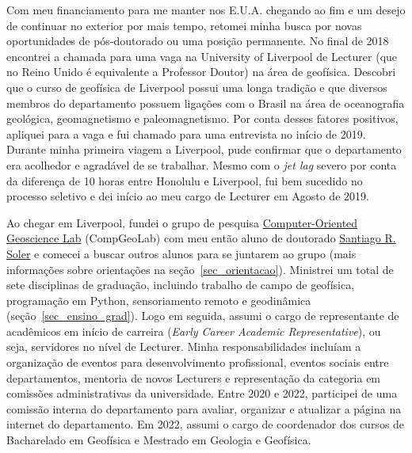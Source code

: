 \documentclass[12pt,a4paper,oneside]{book}
\newcommand{\UoL}{University of Liverpool}
\newcommand{\SantiagoLink}{\href{https://www.santisoler.com/}{Santiago R. Soler}}
\begin{document}
Com meu financiamento para me manter nos E.U.A. chegando ao fim e um desejo de
continuar no exterior por mais tempo, retomei minha busca por novas
oportunidades de pós-doutorado ou uma posição permanente.
No final de 2018 encontrei a chamada para uma vaga na \UoL{}
de Lecturer (que no Reino Unido é equivalente a Professor Doutor) na área de
geofísica.
Descobri que o curso de geofísica de Liverpool possui uma longa tradição e
que diversos membros do departamento possuem ligações com o Brasil na área de
oceanografia geológica, geomagnetismo e paleomagnetismo.
Por conta desses fatores positivos, apliquei para a vaga e fui chamado para
uma entrevista no início de 2019.
Durante minha primeira viagem a Liverpool, pude confirmar que o departamento
era acolhedor e agradável de se trabalhar.
Mesmo com o \textit{jet lag} severo por conta da diferença de 10 horas entre
Honolulu e Liverpool, fui bem sucedido no processo seletivo e dei início ao meu
cargo de Lecturer em Agosto de 2019.

Ao chegar em Liverpool, fundei o grupo de pesquisa
\href{https://www.compgeolab.org/}{Computer-Oriented Geoscience Lab} (CompGeoLab)
com meu então aluno de doutorado
\SantiagoLink{} e comecei a buscar outros
alunos para se juntarem ao grupo (mais informações sobre orientações na
seção~\ref{sec_orientacao}).
Ministrei um total de sete disciplinas de graduação, incluindo trabalho de
campo de geofísica, programação em Python, sensoriamento remoto e geodinâmica
(seção~\ref{sec_ensino_grad}).
Logo em seguida, assumi o cargo de representante de acadêmicos em início de
carreira (\textit{Early Career Academic Representative}), ou seja, servidores
no nível de Lecturer.
Minha responsabilidades incluíam a organização de eventos para desenvolvimento
profissional, eventos sociais entre departamentos, mentoria de novos Lecturers
e representação da categoria em comissões administrativas da universidade.
Entre 2020 e 2022, participei de uma comissão interna do departamento para
avaliar, organizar e atualizar a página na internet do departamento.
Em 2022, assumi o cargo de coordenador dos cursos de Bacharelado em Geofísica
e Mestrado em Geologia e Geofísica.
\end{document}
